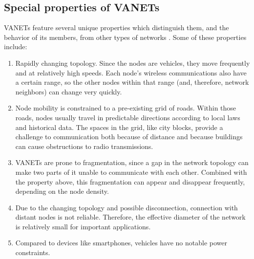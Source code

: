 

\subsection{Special properties of VANETs}
\label{section:properties}
VANETs feature several unique properties which distinguish them, and the behavior of its members, from other types of networks \citep{yousefi2006vehicular}.
Some of these properties include:

\begin{enumerate}

	\item 	Rapidly changing topology.
			Since the nodes are vehicles, they move frequently and at relatively high speeds.
			Each node's wireless communications also have a certain range, so the other nodes within that range (and, therefore, network neighbors) can change very quickly.
			
	\item	Node mobility is constrained to a pre-existing grid of roads.
			Within those roads, nodes usually travel in predictable directions according to local laws and historical data.
			The spaces in the grid, like city blocks, provide a challenge to communication both because of distance and because buildings can cause obstructions to radio transmissions.
			
	\item	VANETs are prone to fragmentation, since a gap in the network topology can make two parts of it unable to communicate with each other.
			Combined with the property above, this fragmentation can appear and disappear frequently, depending on the node density.
			
	\item	Due to the changing topology and possible disconnection, connection with distant nodes is not reliable.
			Therefore, the effective diameter of the network is relatively small for important applications.
			
	\item 	Compared to devices like smartphones, vehicles have no notable power constraints.


\end{enumerate}
